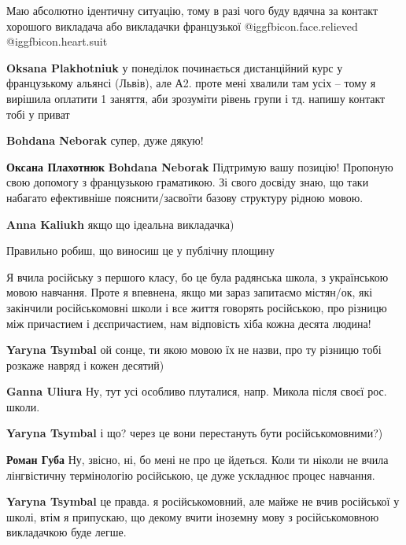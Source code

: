 \begin{itemize}
Маю абсолютно ідентичну ситуацію, тому в разі чого буду вдячна за контакт
хорошого викладача або викладачки французької  @igg{fbicon.face.relieved} @igg{fbicon.heart.suit}

\begin{itemize} %
\textbf{Oksana Plakhotniuk} у понеділок починається дистанційний курс у французькому альянсі (Львів), але А2. проте мені хвалили там усіх – тому я вирішила оплатити 1 заняття, аби зрозуміти рівень групи і тд. напишу контакт тобі у приват

\textbf{Bohdana Neborak} супер, дуже дякую!

\textbf{Оксана Плахотнюк} \textbf{Bohdana Neborak} Підтримую вашу позицію! Пропоную свою допомогу з французькою граматикою. Зі свого досвіду знаю, що таки набагато ефективніше пояснити/засвоїти базову структуру рідною мовою.

\textbf{Anna Kaliukh} якщо що ідеальна викладачка)

\end{itemize} %

Правильно робиш, що виносиш це у публічну площину


Я вчила російську з першого класу, бо це була радянська школа, з українською
мовою навчання. Проте я впевнена, якщо ми зараз запитаємо містян/ок, які
закінчили російськомовні школи і все життя говорять російською, про різницю між
причастием і дєєпричастием, нам відповість хіба кожна десята людина!

\begin{itemize} %
\textbf{Yaryna Tsymbal} ой сонце, ти якою мовою їх не назви, про ту різницю тобі розкаже навряд і кожен десятий)

\textbf{Ganna Uliura} Ну, тут усі особливо плуталися, напр. Микола після своєї рос. школи.

\textbf{Yaryna Tsymbal} і що? через це вони перестануть бути російськомовними?)

\textbf{Роман Губа} Ну, звісно, ні, бо мені не про це йдеться. Коли ти ніколи не вчила лінгвістичну термінологію російською, це дуже ускладнює процес навчання.

\textbf{Yaryna Tsymbal} це правда. я російськомовний, але майже не вчив російської у школі, втім я припускаю, що декому вчити іноземну мову з російськомовною викладачкою буде легше.


\end{itemize}
\end{itemize}

